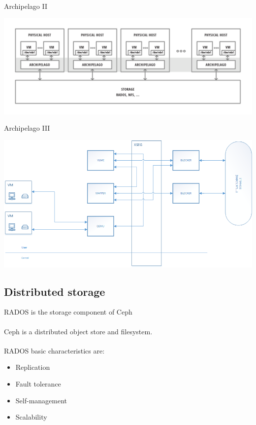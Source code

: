\begin{frame}{Archipelago II}
\begin{center}
    \includegraphics[scale=0.4]{images/archipelago-overview.png} \\
\end{center}
\end{frame}


\begin{frame}{Archipelago III}
\begin{center}
    \includegraphics[scale=0.4]{images/archip-comm.png} \\
\end{center}
\end{frame}

\subsection{Distributed storage}

\begin{frame}{RADOS}
is the storage component of Ceph 
\hfill \\
\hfill \\
Ceph is a distributed object store and filesystem. 
\hfill \\
\hfill \\

RADOS basic characteristics are:
\begin{itemize}
\item Replication
\item Fault tolerance
\item Self-management
\item Scalability
\end{itemize}
\end{frame}


